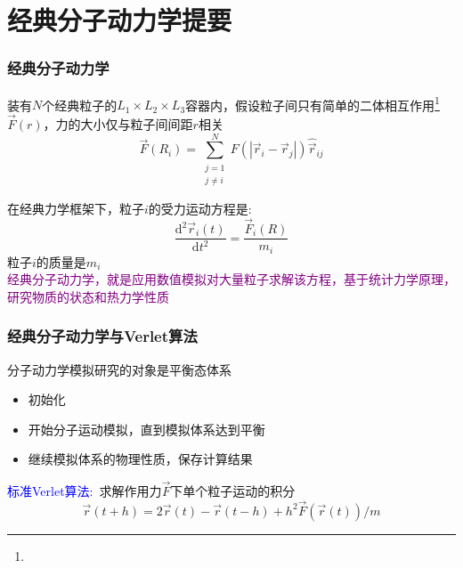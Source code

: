 {\section{经典分子动力学提要}
\frame
{
	\frametitle{经典分子动力学}
	装有$N$个经典粒子的$L_1\times L_2\times L_3$容器内，假设粒子间只有简单的二体相互作用\footnote{\fontsize{7.2pt}{6.2pt}\selectfont{二体作用是粒子间多体相互作用的简化，只考虑粒子两两间彼此相互作用。}}$\vec F(r)$，力的大小仅与粒子间间距$r$相关
	\begin{displaymath}
		\vec F(R_i)=\sum_{\substack{j=1\\j\neq i}}^N F(|\vec r_i-\vec r_j|)\hat{\vec r}_{ij}
	\end{displaymath}
	{\fontsize{7.2pt}{6.2pt}}

	在经典力学框架下，粒子$i$的受力运动方程是:~
	\begin{displaymath}
		\dfrac{\mathrm{d}^2\vec r_i(t)}{\mathrm{d}t^2}=\dfrac{\vec F_i(R)}{m_i}
	\end{displaymath}
	粒子$i$的质量是$m_i$\\
	\textcolor{purple}{经典分子动力学，就是应用数值模拟对大量粒子求解该方程，基于统计力学原理，研究物质的状态和热力学性质}
}

\frame
{
	\frametitle{经典分子动力学与\textrm{Verlet}算法}
	分子动力学模拟研究的对象是平衡态体系
	\begin{itemize}
		\item 初始化
		\item 开始分子运动模拟，直到模拟体系达到平衡
		\item 继续模拟体系的物理性质，保存计算结果
	\end{itemize}
	\textcolor{blue}{标准\textrm{Verlet}算法:~}求解作用力$\vec F$下单个粒子运动的积分
	\begin{displaymath}
		\vec r(t+h)=2\vec r(t)-\vec r(t-h)+h^2\vec F(\vec r(t))/m
	\end{displaymath}
	{\fontsize{7.2pt}{6.2pt}}
}

}
